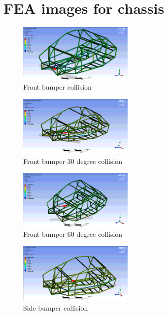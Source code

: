 \documentclass[10pt]{article}
\begin{document}
\clearpage
\section{FEA images for chassis}
\label{sec:fea-chassis-images}

\begin{figure}[H]
\centering
\includegraphics[width=0.5\textwidth]{figures/fea/chassis/chassis-collision-bumper-front}
\caption{Front bumper collision}
\label{sec:chassis-collision-bumper-front}
\end{figure}

\begin{figure}[H]
\centering
\includegraphics[width=0.5\textwidth]{figures/fea/chassis/chassis-collision-bumper-30deg}
\caption{Front bumper 30 degree collision}
\label{sec:chassis-collision-bumper-30deg}
\end{figure}

\begin{figure}[H]
\centering
\includegraphics[width=0.5\textwidth]{figures/fea/chassis/chassis-collision-bumper-60deg}
\caption{Front bumper 60 degree collision}
\label{sec:chassis-collision-bumper-60deg}
\end{figure}

\begin{figure}[H]
\centering
\includegraphics[width=0.5\textwidth]{figures/fea/chassis/chassis-collision-bumper-side}
\caption{Side bumper collision}
\label{sec:chassis-collision-bumper-side}
\end{figure}
\end{document}
